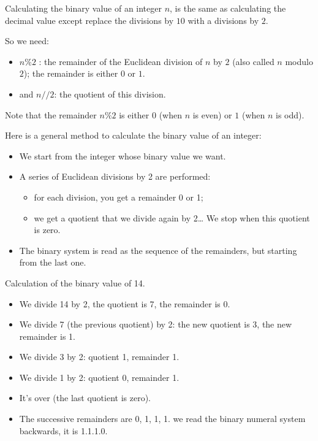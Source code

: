 \documentclass[11pt,class=report,crop=false]{standalone}
\begin{document}
\begin{cours}

Calculating the binary value of an integer $n$, is the same as calculating the decimal value except replace the divisions by $10$ with a divisions by $2$.

So we need:
  \begin{itemize}
    \item $n\%2$ : the remainder of the Euclidean division of $n$ by $2$ (also called $n$ modulo $2$); the remainder is either $0$ or $1$.
    \item and $n//2$: the quotient of this division. 
  \end{itemize}
  
  Note that the remainder $n\%2$ is either $0$ (when $n$ is even) or $1$ (when $n$ is odd).
  
  Here is a general method to calculate the binary value of an integer:
\begin{itemize}
  \item We start from the integer whose binary value we want.
  
  \item A series of Euclidean divisions by 2 are performed: 
  \begin{itemize}
    \item for each division, you get a remainder 0 or 1; 
    \item we get a quotient that we divide again by 2\ldots{} We stop when this quotient is zero.
  \end{itemize}
  
  \item The binary system is read as the sequence of the remainders, but starting from the last one.
\end{itemize}

\begin{exemple}
Calculation of the binary value of 14.

\begin{itemize}
  \item We divide 14 by 2, the quotient is 7, the remainder is 0.
  \item We divide 7 (the previous quotient) by 2: the new quotient is 3, the new remainder is 1.
  \item We divide 3 by 2: quotient 1, remainder 1.
  \item We divide 1 by 2: quotient 0, remainder 1.
  \item It's over (the last quotient is zero).
  \item The successive remainders are 0, 1, 1, 1. we read the binary numeral system backwards, it is 1.1.1.0.  
\end{itemize}


\end{exemple}
\end{cours}
\end{document}
